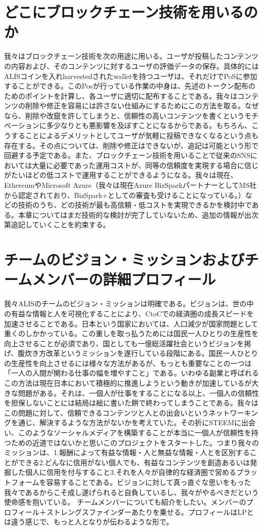 \documentclass{jsarticle}
\begin{document}
\section{どこにブロックチェーン技術を用いるのか}
我々はブロックチェーン技術を次の用途に用いる。ユーザが投稿したコンテンツの内容および、そのコンテンツに対するユーザの評価データの保存。具体的にはALISコインを入れharvestedされたwalletを持つユーザは、それだけでPoSに参加することができる。このPosが行っている作業の中身は、先述のトークン配布のためのポイントを計算し、各ユーザに適切に配布することである。我々はコンテンツの削除や修正を容易には許さない仕組みにするためにこの方法を取る。なぜなら、削除や改竄を許してしまうと、信頼性の高いコンテンツを書くというモチベーションに多少なりとも悪影響を及ぼすことになるからである。もちろん、こうすることによるデメリットとしてユーザが気軽に投稿できなくなるという点も存在する。その点については、削除や修正はできないが、追記は可能という形で回避する予定である。また、ブロックチェーン技術を用いることで従来のSNSにおいては大量に必要であった運用コストが、同等の信頼度を実現する場合に信じがたいほどの低コストで運用することができるようになる。我々は現在、EthereumやMicrosoft Azure（我々は現在Azure BizSparkパートナーとしてMS社から認定されており、BizSpark+としての審査も受けることになっている。）などの技術のうち、どの技術が最も高信頼・低コストを実現できるかを検討中である。本章についてはまだ技術的な検討が完了していないため、追加の情報が出次第追記していくことを約束する。
\section{チームのビジョン・ミッションおよびチームメンバーの詳細プロフィール}
我々ALISのチームのビジョン・ミッションは明確である。ビジョンは、世の中の有益な情報と人を可視化することにより、CtoCでの経済圏の成長スピードを加速させることである。日本という国家においては、人口減少が国家問題として重くのしかかっている。この重しを取っ払うためには国民一人ひとりの生産性を向上させることが必須であり、国としても一億総活躍社会というビジョンを掲げ、腹炊き方改革というミッションを遂行している段階にある。国民一人ひとりの生産性を向上させるには様々な方法があるが、もっとも重要なことの一つは「一人の人間が関わる仕事の幅を増やすこと」である。いわゆる副業と呼ばれるこの方法は現在日本において積極的に推進しようという動きが加速しているが大きな問題がある。それは、一個人が仕事をすることになる以上、一個人の信頼性を担保しないことには結局は絵に書いた餅で終わってしまうことである。我々はこの問題に対して、信頼できるコンテンツと人との出会いというネットワーキングを通じ、解決するような方法がないかを考えていた。その折にSTEEMに出会い、このようなソーシャルメディアを構築することが本当に一個人が信頼性を持つための近道ではないかと思いこのプロジェクトをスタートした。つまり我々のミッションは、1.報酬によって有益な情報・人と無益な情報・人とを区別することができる2.どんなに信用がない個人でも、有益なコンテンツを創造あるいは発掘した個人に信用を付与すること3.それを人々が自律的な経済圏で営めるプラットフォームを容易することである。ビジョンに対して真っ直ぐな思いをもった我々であるからこそ成し遂げられると自負しているし、我々がやるべきだという使命感を抱いている。
チームメンバーについても紹介をしたい。メンバーのプロフィール＋ストレングスファインダーあたりを乗せる。プロフィールはLPとは違う感じで、もっと人となりが伝わるような形で。
\end{document}
